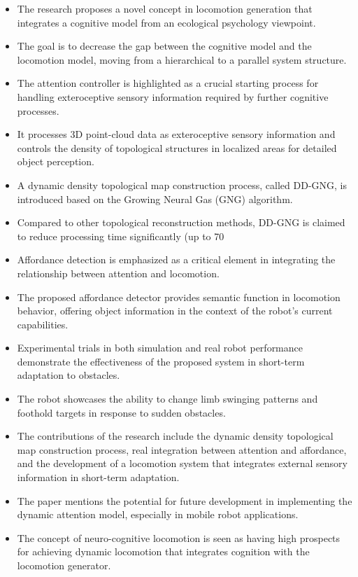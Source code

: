 \begin{itemize}
    \item The research proposes a novel concept in locomotion generation that integrates a cognitive model from an ecological psychology viewpoint.
    \item The goal is to decrease the gap between the cognitive model and the locomotion model, moving from a hierarchical to a parallel system structure.
    \item The attention controller is highlighted as a crucial starting process for handling exteroceptive sensory information required by further cognitive processes.
    \item It processes 3D point-cloud data as exteroceptive sensory information and controls the density of topological structures in localized areas for detailed object perception.
    \item A dynamic density topological map construction process, called DD-GNG, is introduced based on the Growing Neural Gas (GNG) algorithm.
    \item Compared to other topological reconstruction methods, DD-GNG is claimed to reduce processing time significantly (up to 70%
    \item Affordance detection is emphasized as a critical element in integrating the relationship between attention and locomotion.
    \item The proposed affordance detector provides semantic function in locomotion behavior, offering object information in the context of the robot's current capabilities.
    \item Experimental trials in both simulation and real robot performance demonstrate the effectiveness of the proposed system in short-term adaptation to obstacles.
    \item The robot showcases the ability to change limb swinging patterns and foothold targets in response to sudden obstacles.
    \item The contributions of the research include the dynamic density topological map construction process, real integration between attention and affordance, and the development of a locomotion system that integrates external sensory information in short-term adaptation.
    \item The paper mentions the potential for future development in implementing the dynamic attention model, especially in mobile robot applications.
    \item The concept of neuro-cognitive locomotion is seen as having high prospects for achieving dynamic locomotion that integrates cognition with the locomotion generator.
\end{itemize}
    
